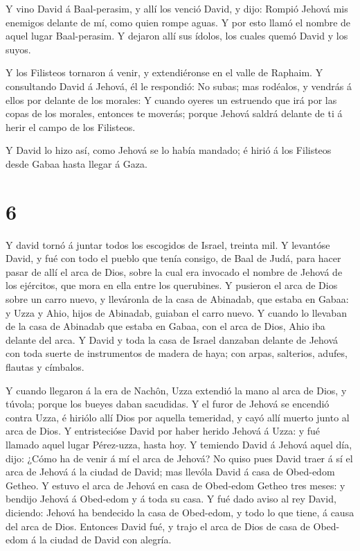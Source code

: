  Y vino David á Baal-perasim, y allí los venció David, y
dijo: Rompió Jehová mis enemigos delante de mí, como quien rompe aguas.
Y por esto llamó el nombre de aquel lugar Baal-perasim.  Y
dejaron allí sus ídolos, los cuales quemó David y los suyos.

 Y los Filisteos tornaron á venir, y extendiéronse en el
valle de Raphaim.  Y consultando David á Jehová, él le
respondió: No subas; mas rodéalos, y vendrás á ellos por delante de los
morales:  Y cuando oyeres un estruendo que irá por las
copas de los morales, entonces te moverás; porque Jehová saldrá delante
de ti á herir el campo de los Filisteos.

 Y David lo hizo así, como Jehová se lo había mandado; é
hirió á los Filisteos desde Gabaa hasta llegar á Gaza.

\hypertarget{section-5}{%
\section{6}\label{section-5}}

 Y david tornó á juntar todos los escogidos de Israel,
treinta mil.  Y levantóse David, y fué con todo el pueblo
que tenía consigo, de Baal de Judá, para hacer pasar de allí el arca de
Dios, sobre la cual era invocado el nombre de Jehová de los ejércitos,
que mora en ella entre los querubines.  Y pusieron el arca
de Dios sobre un carro nuevo, y lleváronla de la casa de Abinadab, que
estaba en Gabaa: y Uzza y Ahio, hijos de Abinadab, guiaban el carro
nuevo.  Y cuando lo llevaban de la casa de Abinadab que
estaba en Gabaa, con el arca de Dios, Ahio iba delante del arca.
 Y David y toda la casa de Israel danzaban delante de Jehová
con toda suerte de instrumentos de madera de haya; con arpas, salterios,
adufes, flautas y címbalos.

 Y cuando llegaron á la era de Nachôn, Uzza extendió la mano
al arca de Dios, y túvola; porque los bueyes daban sacudidas.
 Y el furor de Jehová se encendió contra Uzza, é hiriólo
allí Dios por aquella temeridad, y cayó allí muerto junto al arca de
Dios.  Y entristecióse David por haber herido Jehová á Uzza:
y fué llamado aquel lugar Pérez-uzza, hasta hoy.  Y temiendo
David á Jehová aquel día, dijo: ¿Cómo ha de venir á mí el arca de
Jehová?  No quiso pues David traer á sí el arca de Jehová á
la ciudad de David; mas llevóla David á casa de Obed-edom Getheo.
 Y estuvo el arca de Jehová en casa de Obed-edom Getheo
tres meses: y bendijo Jehová á Obed-edom y á toda su casa. 
Y fué dado aviso al rey David, diciendo: Jehová ha bendecido la casa de
Obed-edom, y todo lo que tiene, á causa del arca de Dios. Entonces David
fué, y trajo el arca de Dios de casa de Obed-edom á la ciudad de David
con alegría.

